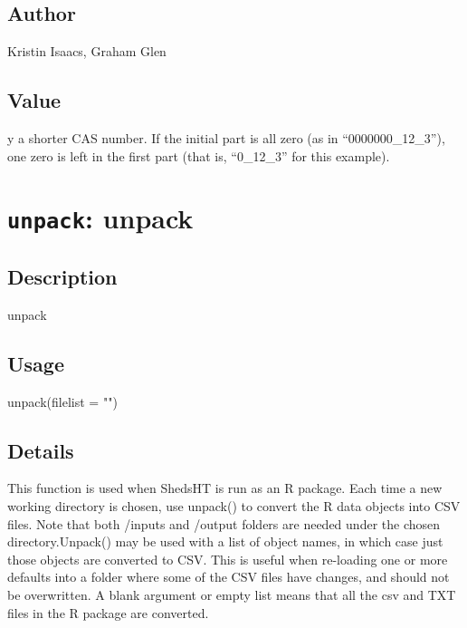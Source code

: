 \documentclass[
]{article}
\newenvironment{Shaded}{\begin{snugshade}}{\end{snugshade}}
\newcommand{\AttributeTok}[1]{\textcolor[rgb]{0.77,0.63,0.00}{#1}}
\newcommand{\FunctionTok}[1]{\textcolor[rgb]{0.00,0.00,0.00}{#1}}
\newcommand{\NormalTok}[1]{#1}
\newcommand{\StringTok}[1]{\textcolor[rgb]{0.31,0.60,0.02}{#1}}
\begin{document}
\hypertarget{author-34}{%
\subsection{Author}\label{author-34}}

Kristin Isaacs, Graham Glen

\hypertarget{value-37}{%
\subsection{Value}\label{value-37}}

y a shorter CAS number. If the initial part is all zero (as in
``0000000\_12\_3''), one zero is left in the first part (that is,
``0\_12\_3'' for this example).

\hypertarget{unpack-unpack}{%
\section{\texorpdfstring{\texttt{unpack}:
unpack}{unpack: unpack}}\label{unpack-unpack}}

\hypertarget{description-55}{%
\subsection{Description}\label{description-55}}

unpack

\hypertarget{usage-55}{%
\subsection{Usage}\label{usage-55}}

\begin{Shaded}
\begin{Highlighting}[]
\FunctionTok{unpack}\NormalTok{(}\AttributeTok{filelist =} \StringTok{""}\NormalTok{)}
\end{Highlighting}
\end{Shaded}

\hypertarget{details-32}{%
\subsection{Details}\label{details-32}}

This function is used when ShedsHT is run as an R package. Each time a
new working directory is chosen, use unpack() to convert the R data
objects into CSV files. Note that both /inputs and /output folders are
needed under the chosen directory.Unpack() may be used with a list of
object names, in which case just those objects are converted to CSV.
This is useful when re-loading one or more defaults into a folder where
some of the CSV files have changes, and should not be overwritten. A
blank argument or empty list means that all the csv and TXT files in the
R package are converted.
\end{document}
